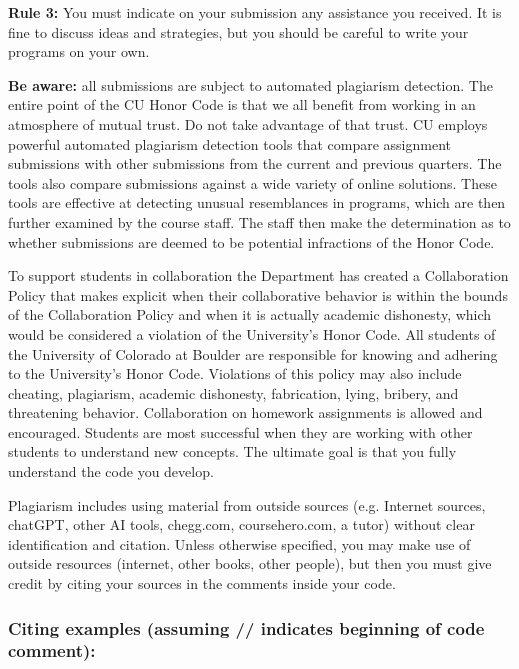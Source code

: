 \textbf{Rule 3: }You must indicate on your submission any assistance you received. It is fine to discuss ideas and strategies, but you should be careful to write your programs on your own.

\textbf{Be aware: }all submissions are subject to automated plagiarism detection. The entire point of the CU Honor Code is that we all benefit from working in an atmosphere of mutual trust. Do not take advantage of that trust. CU employs powerful automated plagiarism detection tools that compare assignment submissions with other submissions from the current and previous quarters. The tools also compare submissions against a wide variety of online solutions. These tools are effective at detecting unusual resemblances in programs, which are then further examined by the course staff. The staff then make the determination as to whether submissions are deemed to be potential infractions of the Honor Code.

To support students in collaboration the Department has created a Collaboration Policy that makes explicit when their collaborative behavior is within the bounds of the Collaboration Policy and when it is actually academic dishonesty, which would be considered a violation of the University’s Honor Code. All students of the University of Colorado at Boulder are responsible for knowing and adhering to the University’s Honor Code. Violations of this policy may also include cheating, plagiarism, academic dishonesty, fabrication, lying, bribery, and threatening behavior. Collaboration on homework assignments is allowed and encouraged. Students are most successful when they are working with other students to understand new concepts. The ultimate goal is that you fully understand the code you develop. 

Plagiarism includes using material from outside sources (e.g. Internet sources, chatGPT, other AI tools, chegg.com, coursehero.com, a tutor) without clear identification and citation. Unless otherwise specified, you may make use of outside resources (internet, other books, other people), but then you must give credit by citing your sources in the comments inside your code.

\subsubsection{Citing examples (assuming // indicates beginning of code comment):}

